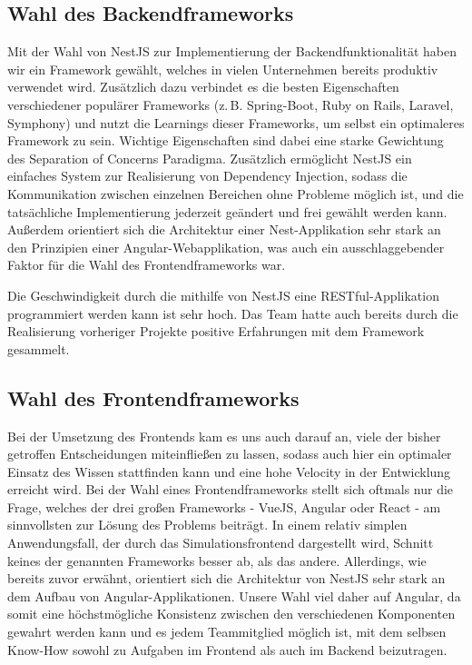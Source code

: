 \subsection*{Wahl des Backendframeworks}

Mit der Wahl von NestJS zur Implementierung der Backendfunktionalität haben wir ein Framework gewählt, welches in vielen Unternehmen bereits produktiv verwendet wird. Zusätzlich dazu verbindet es die besten Eigenschaften verschiedener populärer Frameworks (z.\,B. Spring-Boot, Ruby on Rails, Laravel, Symphony) und nutzt die Learnings dieser Frameworks, um selbst ein optimaleres Framework zu sein. Wichtige Eigenschaften sind dabei eine starke Gewichtung des Separation of Concerns Paradigma. Zusätzlich ermöglicht NestJS ein einfaches System zur Realisierung von Dependency Injection, sodass die Kommunikation zwischen einzelnen Bereichen ohne Probleme möglich ist, und die tatsächliche Implementierung jederzeit geändert und frei gewählt werden kann.\\
Außerdem orientiert sich die Architektur einer Nest-Applikation sehr stark an den Prinzipien einer Angular-Webapplikation, was auch ein ausschlaggebender Faktor für die Wahl des Frontendframeworks war.

Die Geschwindigkeit durch die mithilfe von NestJS eine RESTful-Applikation programmiert werden kann ist sehr hoch. Das Team hatte auch bereits durch die Realisierung vorheriger Projekte positive Erfahrungen mit dem Framework gesammelt.

\subsection*{Wahl des Frontendframeworks}
Bei der Umsetzung des Frontends kam es uns auch darauf an, viele der bisher getroffen Entscheidungen miteinfließen zu lassen, sodass auch hier ein optimaler Einsatz des Wissen stattfinden kann und eine hohe Velocity in der Entwicklung erreicht wird. Bei der Wahl eines Frontendframeworks stellt sich oftmals nur die Frage, welches der drei großen Frameworks - VueJS, Angular oder React - am sinnvollsten zur Lösung des Problems beiträgt. In einem relativ simplen Anwendungsfall, der durch das Simulationsfrontend dargestellt wird, Schnitt keines der genannten Frameworks besser ab, als das andere. Allerdings, wie bereits zuvor erwähnt, orientiert sich die Architektur von NestJS sehr stark an dem Aufbau von Angular-Applikationen. Unsere Wahl viel daher auf Angular, da somit eine höchstmögliche Konsistenz zwischen den verschiedenen Komponenten gewahrt werden kann und es jedem Teammitglied möglich ist, mit dem selbsen Know-How sowohl zu Aufgaben im Frontend als auch im Backend beizutragen.







